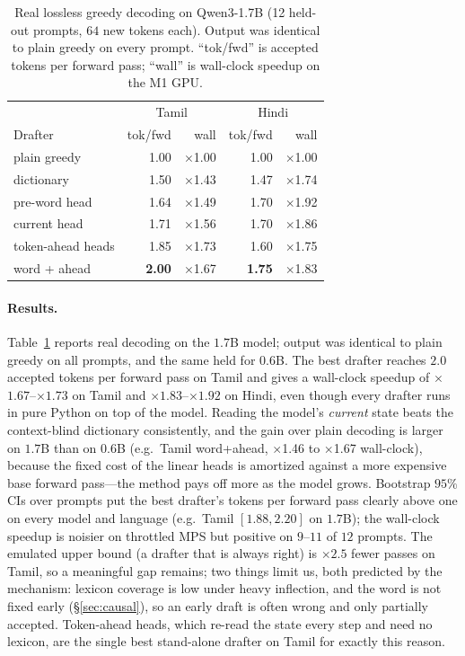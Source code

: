 \documentclass[11pt]{article}
\newcommand{\x}{$\times$}
\begin{document}
\begin{table}[t]
\centering\small
\begin{tabular}{lrrrr}
\toprule
 & \multicolumn{2}{c}{Tamil} & \multicolumn{2}{c}{Hindi} \\
Drafter & tok/fwd & wall & tok/fwd & wall \\
\midrule
plain greedy & 1.00 & \x1.00 & 1.00 & \x1.00 \\
dictionary & 1.50 & \x1.43 & 1.47 & \x1.74 \\
pre-word head & 1.64 & \x1.49 & 1.70 & \x1.92 \\
current head & 1.71 & \x1.56 & 1.70 & \x1.86 \\
token-ahead heads & 1.85 & \x1.73 & 1.60 & \x1.75 \\
word + ahead & \textbf{2.00} & \x1.67 & \textbf{1.75} & \x1.83 \\
\bottomrule
\end{tabular}
\caption{Real lossless greedy decoding on Qwen3-1.7B (12 held-out prompts,
$64$ new tokens each). Output was identical to plain greedy on every prompt.
``tok/fwd'' is accepted tokens per forward pass; ``wall'' is wall-clock speedup
on the M1 GPU.}
\label{tab:decode}
\end{table}

\paragraph{Results.} Table~\ref{tab:decode} reports real decoding on the
$1.7$B model; output was identical to plain greedy on all prompts, and the same
held for $0.6$B. The best drafter reaches $2.0$ accepted tokens per forward pass
on Tamil and gives a wall-clock speedup of \x$1.67$--\x$1.73$ on Tamil and
\x$1.83$--\x$1.92$ on Hindi, even though every drafter runs in pure Python on
top of the model. Reading the model's \emph{current} state beats the
context-blind dictionary consistently, and the gain over plain decoding is
larger on $1.7$B than on $0.6$B (e.g.\ Tamil word+ahead, \x1.46 to \x1.67
wall-clock), because the fixed cost of the linear heads is amortized against a
more expensive base forward pass---the method pays off more as the model grows.
Bootstrap $95\%$ CIs over prompts put the best drafter's tokens per forward pass
clearly above one on every model and language (e.g.\ Tamil $[1.88,2.20]$ on
$1.7$B); the wall-clock speedup is noisier on throttled MPS but positive on
$9$--$11$ of $12$ prompts.
The emulated upper bound (a drafter that is always right) is \x$2.5$ fewer
passes on Tamil, so a meaningful gap remains; two things limit us, both
predicted by the mechanism: lexicon coverage is low under heavy inflection, and
the word is not fixed early (\S\ref{sec:causal}), so an early draft is often
wrong and only partially accepted. Token-ahead heads, which re-read the state
every step and need no lexicon, are the single best stand-alone drafter on
Tamil for exactly this reason.
\end{document}
